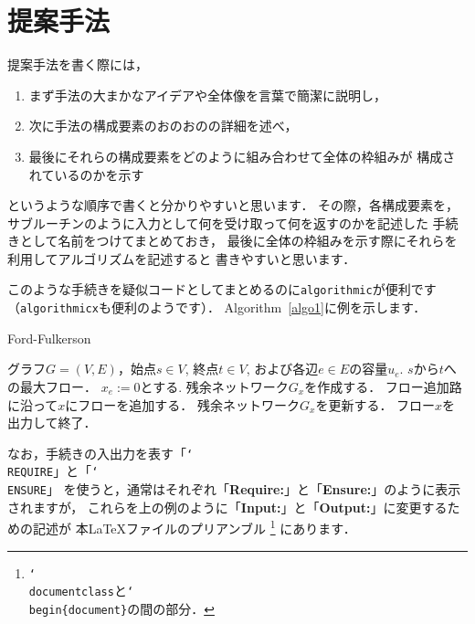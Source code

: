 \chapter{提案手法}\label{method}
提案手法を書く際には，
\begin{enumerate}
 \item まず手法の大まかなアイデアや全体像を言葉で簡潔に説明し，
 \item 次に手法の構成要素のおのおのの詳細を述べ，
 \item 最後にそれらの構成要素をどのように組み合わせて全体の枠組みが
       構成されているのかを示す
\end{enumerate}
というような順序で書くと分かりやすいと思います．
その際，各構成要素を，
サブルーチンのように入力として何を受け取って何を返すのかを記述した
手続きとして名前をつけてまとめておき，
最後に全体の枠組みを示す際にそれらを利用してアルゴリズムを記述すると
書きやすいと思います．

このような手続きを疑似コードとしてまとめるのに\texttt{algorithmic}が便利です
（\texttt{algorithmicx}も便利のようです）．
Algorithm~\ref{algo1}に例を示します．
\begin{algorithm}
 \caption{Ford-Fulkerson}
 \label{algo1}
 \begin{algorithmic}[1]%
  \REQUIRE グラフ$G = (V, E)$，始点$s \in V$, 終点$t \in V$, および各辺$e \in E$の容量$u_e$.
  \ENSURE  $s$から$t$への最大フロー．
  \STATE $x_e := 0$とする.
  \ENDFOR
  \STATE 残余ネットワーク$G_x$を作成する．
  \STATE フロー追加路に沿って$x$にフローを追加する．
  \STATE 残余ネットワーク$G_x$を更新する．
  \ENDWHILE
  \STATE フロー$x$を出力して終了．
 \end{algorithmic}
\end{algorithm}

なお，手続きの入出力を表す「\texttt{\char`\\REQUIRE}」と「\texttt{\char`\\ENSURE}」
を使うと，通常はそれぞれ「\textbf{Require:}」と「\textbf{Ensure:}」のように表示されますが，
これらを上の例のように「\textbf{Input:}」と「\textbf{Output:}」に変更するための記述が
本\LaTeX ファイルのプリアンブル
\footnote{\texttt{\char`\\documentclass}と\texttt{\char`\\begin\{document\}}の間の部分．}
にあります．

